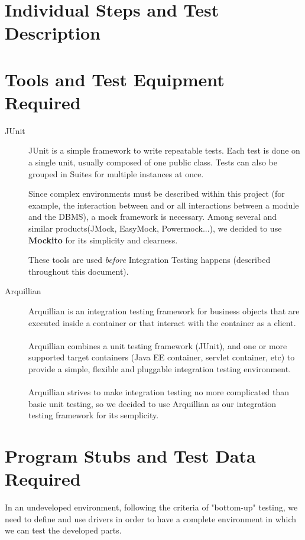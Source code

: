 \documentclass[a4paper, 12pt]{article}
\newcounter{tc}
\begin{document}
\newpage
\section{Individual Steps and Test Description}
\label{sub:individual_steps_and_test_description}


\newpage
\section{Tools and Test Equipment Required}
\label{sub:tools_and_test_equipment_required}

\begin{description}
    \item[JUnit] JUnit is a simple framework to write repeatable tests. Each test is done on a single unit, usually composed of one public class. Tests can also be grouped in Suites for multiple instances at once.

    Since complex environments must be described within this project (for example, the interaction between  and  or all interactions between a module and the DBMS), a mock framework is necessary. Among several and similar products(JMock, EasyMock, Powermock...), we decided to use \textbf{Mockito} for its simplicity and clearness.

    These tools are used \emph{before} Integration Testing happens (described throughout this document).

    \item[Arquillian] Arquillian is an integration testing framework for business objects that are executed inside a container or that interact with the container as a client. \\
\\
Arquillian combines a unit testing framework (JUnit), and one or more supported target containers (Java EE container, servlet container, etc) to provide a simple, flexible and pluggable integration testing environment. \\ \\
Arquillian strives to make integration testing no more complicated than basic unit testing, so we decided to use Arquillian as our integration testing framework for its semplicity.


\end{description}

\newpage
\section{Program Stubs and Test Data Required}
\label{sub:program_stubs_and_test_data_required}
In an undeveloped environment, following the criteria of "bottom-up" testing, we need to define and use drivers in order to have a complete environment in which we can test the developed parts.
\end{document}
